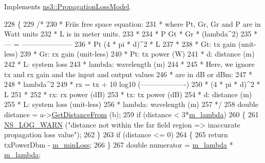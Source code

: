 Implements \hyperlink{classns3_1_1PropagationLossModel_aa6bb73e4132dc5d8e1b49750955838bb}{ns3\+::\+Propagation\+Loss\+Model}.


\begin{DoxyCode}
228 \{
229   \textcolor{comment}{/*}
230 \textcolor{comment}{   * Friis free space equation:}
231 \textcolor{comment}{   * where Pt, Gr, Gr and P are in Watt units}
232 \textcolor{comment}{   * L is in meter units.}
233 \textcolor{comment}{   *}
234 \textcolor{comment}{   *    P     Gt * Gr * (lambda^2)}
235 \textcolor{comment}{   *   --- = ---------------------}
236 \textcolor{comment}{   *    Pt     (4 * pi * d)^2 * L}
237 \textcolor{comment}{   *}
238 \textcolor{comment}{   * Gt: tx gain (unit-less)}
239 \textcolor{comment}{   * Gr: rx gain (unit-less)}
240 \textcolor{comment}{   * Pt: tx power (W)}
241 \textcolor{comment}{   * d: distance (m)}
242 \textcolor{comment}{   * L: system loss}
243 \textcolor{comment}{   * lambda: wavelength (m)}
244 \textcolor{comment}{   *}
245 \textcolor{comment}{   * Here, we ignore tx and rx gain and the input and output values }
246 \textcolor{comment}{   * are in dB or dBm:}
247 \textcolor{comment}{   *}
248 \textcolor{comment}{   *                           lambda^2}
249 \textcolor{comment}{   * rx = tx +  10 log10 (-------------------)}
250 \textcolor{comment}{   *                       (4 * pi * d)^2 * L}
251 \textcolor{comment}{   *}
252 \textcolor{comment}{   * rx: rx power (dB)}
253 \textcolor{comment}{   * tx: tx power (dB)}
254 \textcolor{comment}{   * d: distance (m)}
255 \textcolor{comment}{   * L: system loss (unit-less)}
256 \textcolor{comment}{   * lambda: wavelength (m)}
257 \textcolor{comment}{   */}
258   \textcolor{keywordtype}{double} distance = a->\hyperlink{classns3_1_1MobilityModel_afa16c20b3c5fd135be075000f0272f31}{GetDistanceFrom} (b);
259   \textcolor{keywordflow}{if} (distance < 3*\hyperlink{classns3_1_1FriisPropagationLossModel_a28e4560ba2a05fa63bd2bcc341a7967b}{m\_lambda})
260     \{
261       \hyperlink{group__logging_gade7208b4009cdf0e25783cd26766f559}{NS\_LOG\_WARN} (\textcolor{stringliteral}{"distance not within the far field region => inaccurate propagation loss
       value"});
262     \}
263   \textcolor{keywordflow}{if} (distance <= 0)
264     \{
265       \textcolor{keywordflow}{return} txPowerDbm - \hyperlink{classns3_1_1FriisPropagationLossModel_ae390ab5b83634ed3f5fec7e00fea705d}{m\_minLoss};
266     \}
267   \textcolor{keywordtype}{double} numerator = \hyperlink{classns3_1_1FriisPropagationLossModel_a28e4560ba2a05fa63bd2bcc341a7967b}{m\_lambda} * \hyperlink{classns3_1_1FriisPropagationLossModel_a28e4560ba2a05fa63bd2bcc341a7967b}{m\_lambda};

\end{DoxyCode}
